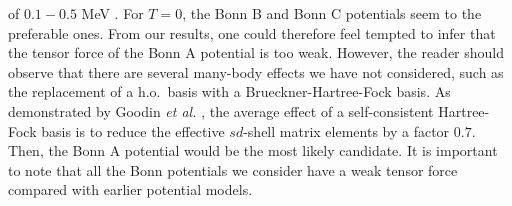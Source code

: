 \begin{itemize}
of $0.1-0.5$ MeV \cite{ee70}. For $T=0$, the Bonn B and Bonn C
potentials seem to the preferable ones. From our results,
one could therefore feel tempted to infer that the tensor
force of the Bonn A potential is too weak.
However,
the reader should observe that there are several
many-body effects we have not
considered, such as the replacement of a h.o.\ basis with a
Brueckner-Hartree-Fock basis. As demonstrated by Goodin {\em et al.}
\cite{geg77}, the average effect of a self-consistent Hartree-Fock
basis is to reduce the effective $sd$-shell matrix elements by a
factor $0.7$. Then, the Bonn A potential would be the most likely
candidate. It is important to note that
all the Bonn potentials we consider have a weak tensor
force compared with earlier potential models.
\end{itemize}



